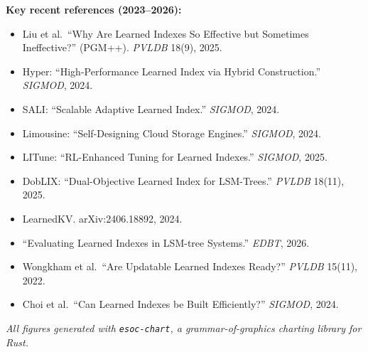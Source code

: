 \documentclass[11pt, a4paper]{article}
\begin{document}
\vspace{0.5em}
\noindent\textbf{Key recent references (2023--2026):}
\begin{itemize}[nosep]
    \item Liu et al.\ ``Why Are Learned Indexes So Effective but Sometimes
        Ineffective?'' (PGM++). \emph{PVLDB} 18(9), 2025.
    \item Hyper: ``High-Performance Learned Index via Hybrid Construction.''
        \emph{SIGMOD}, 2024.
    \item SALI: ``Scalable Adaptive Learned Index.'' \emph{SIGMOD}, 2024.
    \item Limousine: ``Self-Designing Cloud Storage Engines.''
        \emph{SIGMOD}, 2024.
    \item LITune: ``RL-Enhanced Tuning for Learned Indexes.''
        \emph{SIGMOD}, 2025.
    \item DobLIX: ``Dual-Objective Learned Index for LSM-Trees.''
        \emph{PVLDB} 18(11), 2025.
    \item LearnedKV. arXiv:2406.18892, 2024.
    \item ``Evaluating Learned Indexes in LSM-tree Systems.''
        \emph{EDBT}, 2026.
    \item Wongkham et al.\ ``Are Updatable Learned Indexes Ready?''
        \emph{PVLDB} 15(11), 2022.
    \item Choi et al.\ ``Can Learned Indexes be Built Efficiently?''
        \emph{SIGMOD}, 2024.
\end{itemize}

\vspace{2em}
\noindent\small\textit{All figures generated with \texttt{esoc-chart}, a grammar-of-graphics
charting library for Rust.}
\end{document}
